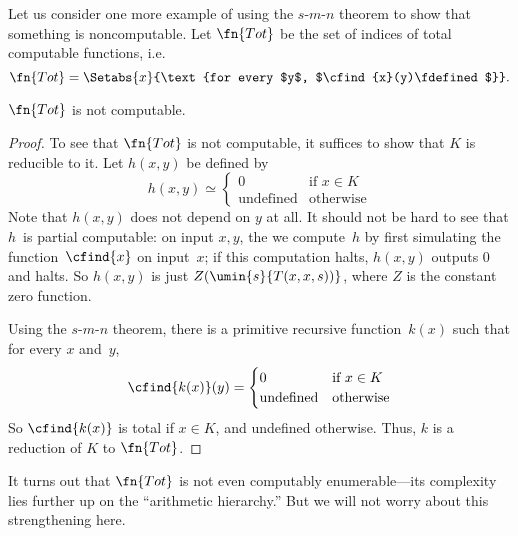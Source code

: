 \documentclass[../../../include/open-logic-section]{subfiles}
\begin{document}

Let us consider one more example of using the $s$-$m$-$n$ theorem to show
that something is noncomputable. Let $\fn{Tot}$ be the set of indices
of total computable functions, i.e.
\[
\fn{Tot} = \Setabs{x}{\text{for every $y$, $\cfind{x}(y)\fdefined$}}.
\]

\begin{prop}
$\fn{Tot}$ is not computable.
\end{prop}

\begin{proof}
To see that $\fn{Tot}$ is not computable, it suffices to show that $K$
is reducible to it. Let $h(x,y)$ be defined by
\[
h(x,y) \simeq
\begin{cases}
0 & \text{if $x \in K$} \\
\text{undefined} & \text{otherwise}
\end{cases}
\]
Note that $h(x,y)$ does not depend on $y$ at all. It should
not be hard to see that $h$~is partial computable: on input $x, y$, the
we compute~$h$ by first simulating the function~$\cfind{x}$ on input~$x$; if
this computation halts, $h(x,y)$ outputs $0$ and halts. So
$h(x,y)$ is just $Z(\umin{s}{T(x,x,s))}$, where $Z$ is the constant zero
function.

Using the $s$-$m$-$n$ theorem, there is a primitive recursive
function~$k(x)$ such that for every $x$ and~$y$,
\[
\cfind{k(x)}(y) =
\begin{cases}
0 & \text{if $x \in K$} \\
\text{undefined} & \text{otherwise}
\end{cases}
\]
So $\cfind{k(x)}$ is total if $x \in K$, and undefined otherwise. Thus,
$k$ is a reduction of $K$ to $\fn{Tot}$.
\end{proof}

\begin{digress}
It turns out that $\fn{Tot}$ is not even computably enumerable---its
complexity lies further up on the ``arithmetic hierarchy.''  But we
will not worry about this strengthening here.
\end{digress}
\end{document}
